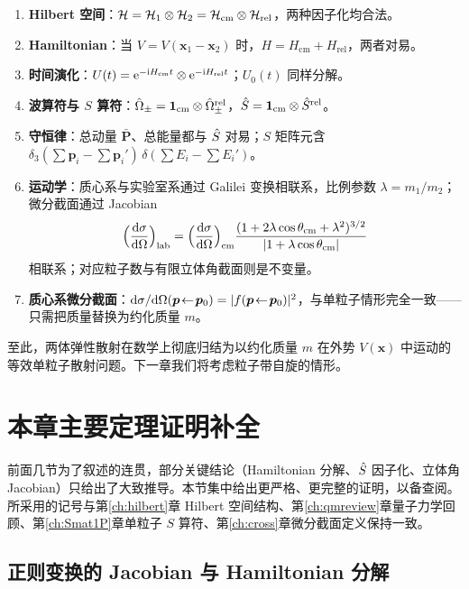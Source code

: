 \begin{enumerate}
  \item \textbf{Hilbert 空间}：$\mathcal{H}=\mathcal{H}_1\otimes\mathcal{H}_2=\mathcal{H}_{\text{cm}}\otimes\mathcal{H}_{\text{rel}}$，两种因子化均合法。
  \item \textbf{Hamiltonian}：当 $V=V(\bm{x}_1-\bm{x}_2)$ 时，$H=H_{\text{cm}}+H_{\text{rel}}$，两者对易。
  \item \textbf{时间演化}：$U(t)=\mathrm{e}^{-\mathrm{i} H_{\text{cm}}t}\otimes\mathrm{e}^{-\mathrm{i} H_{\text{rel}}t}$；$U_0(t)$ 同样分解。
  \item \textbf{波算符与 $S$ 算符}：$\hat{\Omega}_{\pm}=\mathbf{1}_{\text{cm}}\otimes\hat{\Omega}_{\pm}^{\text{rel}}$，$\hat{S}=\mathbf{1}_{\text{cm}}\otimes\hat{S}^{\text{rel}}$。
  \item \textbf{守恒律}：总动量 $\bar{\bm{P}}$、总能量都与 $\hat{S}$ 对易；$S$ 矩阵元含 $\delta_3(\sum\bm{p}_i-\sum\bm{p}_i')\,\delta(\sum E_i-\sum E_i')$。
  \item \textbf{运动学}：质心系与实验室系通过 Galilei 变换相联系，比例参数 $\lambda=m_1/m_2$；微分截面通过 Jacobian
        \[
          \Big(\frac{\mathrm{d}\sigma}{\mathrm{d}\Omega}\Big)_{\text{lab}}
          = \Big(\frac{\mathrm{d}\sigma}{\mathrm{d}\Omega}\Big)_{\text{cm}}
            \frac{(1+2\lambda\cos\theta_{\text{cm}}+\lambda^2)^{3/2}}{|1+\lambda\cos\theta_{\text{cm}}|}
        \]
        相联系；对应粒子数与有限立体角截面则是不变量。
  \item \textbf{质心系微分截面}：$\mathrm{d}\sigma/\mathrm{d}\Omega(\bm{p}\!\leftarrow\!\bm{p}_0)=|f(\bm{p}\!\leftarrow\!\bm{p}_0)|^2$，与单粒子情形完全一致——只需把质量替换为约化质量 $m$。
\end{enumerate}

至此，两体弹性散射在数学上彻底归结为以约化质量 $m$ 在外势 $V(\bm{x})$ 中运动的等效单粒子散射问题。下一章我们将考虑粒子带自旋的情形。

\section{本章主要定理证明补全}\label{sec:2P-proofs}

前面几节为了叙述的连贯，部分关键结论（Hamiltonian 分解、$\hat{S}$ 因子化、立体角 Jacobian）只给出了大致推导。本节集中给出更严格、更完整的证明，以备查阅。所采用的记号与第\ref{ch:hilbert}章 Hilbert 空间结构、第\ref{ch:qmreview}章量子力学回顾、第\ref{ch:Smat1P}章单粒子 $S$ 算符、第\ref{ch:cross}章微分截面定义保持一致。

\subsection{正则变换的 Jacobian 与 Hamiltonian 分解}


